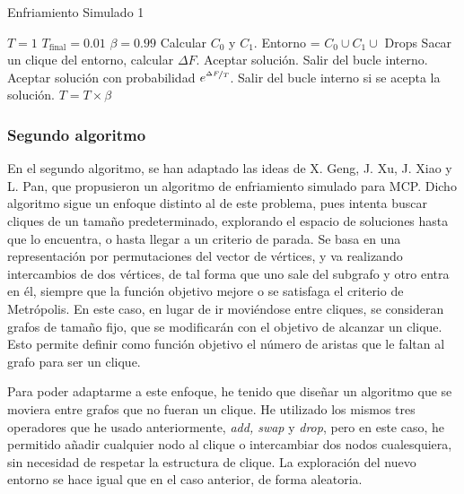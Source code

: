 \begin{algorithm}[H]
\caption{Enfriamiento Simulado 1}
  \begin{algorithmic}
    \State $T = 1$
    \State $T_{\text{final}} = 0.01$
    \State $\beta = 0.99$
    \State Calcular $C_0$ y $C_1$.
    \Repeat
      \State Entorno = $C_0 \cup C_1 \cup$ Drops
      \Repeat
        \State Sacar un clique del entorno, calcular $\Delta F$.
          \State Aceptar solución.
          \State Salir del bucle interno.
        \Else
          \State Aceptar solución con probabilidad $e^{\nicefrac{\Delta F}{T}}$.
          \State Salir del bucle interno si se acepta la solución.
        \EndIf
      \State $T = T \times \beta$
  \end{algorithmic}
\end{algorithm}

\subsubsection{Segundo algoritmo}

En el segundo algoritmo, se han adaptado las ideas de X. Geng, J. Xu, J. Xiao y L. Pan, que propusieron un
algoritmo de enfriamiento simulado para MCP. Dicho algoritmo sigue un enfoque distinto al de este problema,
pues intenta buscar cliques de un tamaño predeterminado, explorando el espacio de soluciones hasta
que lo encuentra, o hasta llegar a un criterio de parada. Se basa en una representación por permutaciones
del vector de vértices, y va realizando intercambios de dos vértices, de tal forma que uno sale del
subgrafo y otro entra en él, siempre que la función objetivo mejore o se satisfaga el criterio de Metrópolis.
En este caso, en lugar de ir moviéndose entre cliques, se consideran grafos de tamaño fijo, que se modificarán
con el objetivo de alcanzar un clique. Esto permite definir como función objetivo el número de aristas que le
faltan al grafo para ser un clique.

Para poder adaptarme a este enfoque, he tenido que diseñar un algoritmo que se moviera entre grafos que no
fueran un clique. He utilizado los mismos tres operadores que he usado anteriormente,
\textit{add, swap} y \textit{drop}, pero en este caso, he permitido añadir cualquier nodo al clique
o intercambiar dos nodos cualesquiera, sin necesidad de respetar la estructura de clique.
La exploración del nuevo entorno se hace igual que en el caso anterior, de forma aleatoria.

